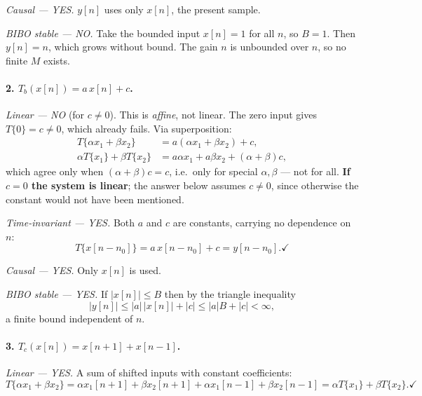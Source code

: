 \emph{Causal — YES.} $y[n]$ uses only $x[n]$, the present sample.

\emph{BIBO stable — NO.} Take the bounded input $x[n] = 1$ for all $n$, so
$B = 1$. Then $y[n] = n$, which grows without bound. The gain $n$ is unbounded
over $n$, so no finite $M$ exists.

\paragraph{2. $T_b(x[n]) = a\,x[n] + c$.}

\emph{Linear — NO} (for $c \ne 0$). This is \emph{affine}, not linear. The zero
input gives $T\{0\} = c \ne 0$, which already fails. Via superposition:
\begin{align}
  T\{\alpha x_1 + \beta x_2\} &= a(\alpha x_1 + \beta x_2) + c, \\
  \alpha T\{x_1\} + \beta T\{x_2\} &= a\alpha x_1 + a\beta x_2 + (\alpha + \beta)c,
\end{align}
which agree only when $(\alpha+\beta)c = c$, i.e.\ only for special $\alpha,\beta$
— not for all. \textbf{If $c = 0$ the system is linear}; the answer below assumes
$c \ne 0$, since otherwise the constant would not have been mentioned.

\emph{Time-invariant — YES.} Both $a$ and $c$ are constants, carrying no
dependence on $n$:
\begin{equation}
  T\{x[n-n_0]\} = a\,x[n-n_0] + c = y[n-n_0]. \checkmark
\end{equation}

\emph{Causal — YES.} Only $x[n]$ is used.

\emph{BIBO stable — YES.} If $|x[n]| \le B$ then by the triangle inequality
\begin{equation}
  |y[n]| \le |a|\,|x[n]| + |c| \le |a|B + |c| < \infty,
\end{equation}
a finite bound independent of $n$.

\paragraph{3. $T_c(x[n]) = x[n+1] + x[n-1]$.}

\emph{Linear — YES.} A sum of shifted inputs with constant coefficients:
\begin{equation}
  T\{\alpha x_1 + \beta x_2\}
    = \alpha x_1[n+1] + \beta x_2[n+1] + \alpha x_1[n-1] + \beta x_2[n-1]
    = \alpha T\{x_1\} + \beta T\{x_2\}. \checkmark
\end{equation}

